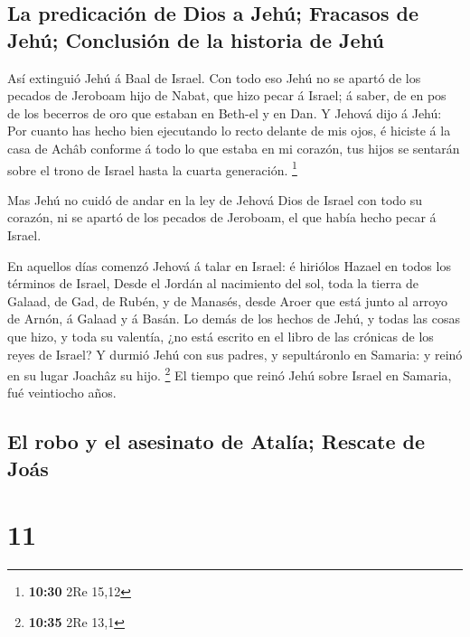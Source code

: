\hypertarget{la-predicaciuxf3n-de-dios-a-jehuxfa-fracasos-de-jehuxfa-conclusiuxf3n-de-la-historia-de-jehuxfa}{%
\subsection{La predicación de Dios a Jehú; Fracasos de Jehú; Conclusión
de la historia de
Jehú}\label{la-predicaciuxf3n-de-dios-a-jehuxfa-fracasos-de-jehuxfa-conclusiuxf3n-de-la-historia-de-jehuxfa}}

 Así extinguió Jehú á Baal de Israel.  Con
todo eso Jehú no se apartó de los pecados de Jeroboam hijo de Nabat, que
hizo pecar á Israel; á saber, de en pos de los becerros de oro que
estaban en Beth-el y en Dan.  Y Jehová dijo á Jehú: Por
cuanto has hecho bien ejecutando lo recto delante de mis ojos, é hiciste
á la casa de Achâb conforme á todo lo que estaba en mi corazón, tus
hijos se sentarán sobre el trono de Israel hasta la cuarta generación.
\footnote{\textbf{10:30} 2Re 15,12}

 Mas Jehú no cuidó de andar en la ley de Jehová Dios de
Israel con todo su corazón, ni se apartó de los pecados de Jeroboam, el
que había hecho pecar á Israel.

 En aquellos días comenzó Jehová á talar en Israel: é
hiriólos Hazael en todos los términos de Israel,  Desde el
Jordán al nacimiento del sol, toda la tierra de Galaad, de Gad, de
Rubén, y de Manasés, desde Aroer que está junto al arroyo de Arnón, á
Galaad y á Basán.  Lo demás de los hechos de Jehú, y todas
las cosas que hizo, y toda su valentía, ¿no está escrito en el libro de
las crónicas de los reyes de Israel?  Y durmió Jehú con sus
padres, y sepultáronlo en Samaria: y reinó en su lugar Joachâz su hijo.
\footnote{\textbf{10:35} 2Re 13,1}  El tiempo que reinó
Jehú sobre Israel en Samaria, fué veintiocho años.

\hypertarget{el-robo-y-el-asesinato-de-ataluxeda-rescate-de-jouxe1s}{%
\subsection{El robo y el asesinato de Atalía; Rescate de
Joás}\label{el-robo-y-el-asesinato-de-ataluxeda-rescate-de-jouxe1s}}

\hypertarget{section-10}{%
\section{11}\label{section-10}}

